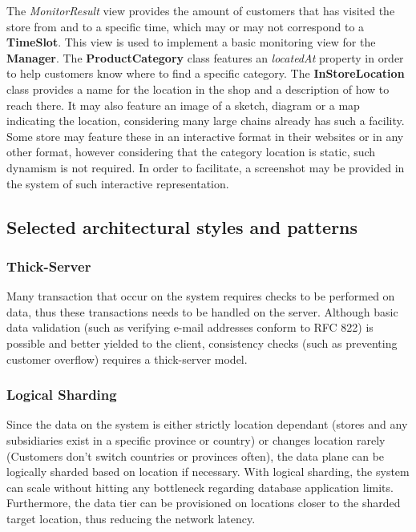 The \textit{MonitorResult} view provides the amount of customers that has visited the store from and to a specific time, which may or may not correspond to a \textbf{TimeSlot}.
This view is used to implement a basic monitoring view for the \textbf{Manager}.
The \textbf{ProductCategory} class features an \textit{locatedAt} property in order to help customers know where to find a specific category.
The \textbf{InStoreLocation} class provides a name for the location in the shop and a description of how to reach there.
It may also feature an image of a sketch, diagram or a map indicating the location, considering many large chains already has such a facility.
Some store may feature these in an interactive format in their websites or in any other format, however considering that the category location is static, such dynamism is not required.
In order to facilitate, a screenshot may be provided in the system of such interactive representation.

\subsection{Selected architectural styles and patterns} %

\subsubsection{Thick-Server}
Many transaction that occur on the system requires checks to be performed on data, thus these transactions needs to be handled on the server.
Although basic data validation (such as verifying e-mail addresses conform to RFC 822) is possible and better yielded to the client, consistency checks (such as preventing customer overflow) requires a thick-server model.
\subsubsection{Logical Sharding}
Since the data on the system is either strictly location dependant (stores and any subsidiaries exist in a specific province or country) or changes location rarely (Customers don't switch countries or provinces often), the data plane can be logically sharded based on location if necessary.
With logical sharding, the system can scale without hitting any bottleneck regarding database application limits.
Furthermore, the data tier can be provisioned on locations closer to the sharded target location, thus reducing the network latency.

